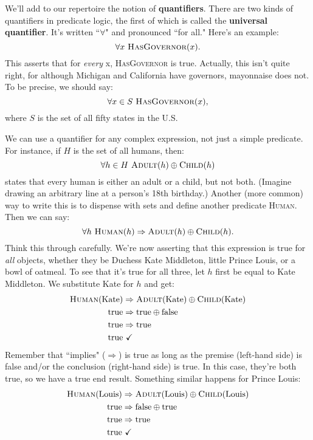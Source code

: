 We'll add to our repertoire the notion of \textbf{quantifiers}. There are
two kinds of quantifiers in predicate logic, the first of which is called
the \textbf{universal quantifier}. It's written ``$\forall$" and pronounced
``for all." Here's an example:
\[
\forall x\ \textsc{HasGovernor}(x).
\]
This asserts that for \textit{every} x, \textsc{HasGovernor} is true.
Actually, this isn't quite right, for although Michigan and California have
governors, mayonnaise does not. To be precise, we should say:
\[
\forall x\in S\ \textsc{HasGovernor}(x),
\]
where $S$ is the set of all fifty states in the U.S.

We can use a quantifier for any complex expression, not just a simple
predicate. For instance, if $H$ is the set of all humans, then:
\[
\forall h\in H\ \textsc{Adult}(h) \oplus \textsc{Child}(h)
\]
states that every human is either an adult or a child, but not both. (Imagine
drawing an arbitrary line at a person's 18th birthday.) Another
(more common) way to write this is to dispense with sets and define another
predicate \textsc{Human}. Then we can say:
\[
\forall h\ \textsc{Human}(h) \Rightarrow \textsc{Adult}(h) \oplus
\textsc{Child}(h).
\]
Think this through carefully. We're now asserting that this expression is
true for \textit{all} objects, whether they be Duchess Kate Middleton, little
Prince Louis, or a
bowl of oatmeal. To see that it's true for all three, let $h$ first be
equal to Kate Middleton. We substitute Kate for $h$ and get:
\begin{align*}
\textsc{Human}(\text{Kate}) & \Rightarrow \textsc{Adult}(\text{Kate}) \oplus \textsc{Child}(\text{Kate}) \\
\text{true} & \Rightarrow \text{true} \oplus \text{false} \\
\text{true} & \Rightarrow \text{true} \\
\text{true} & \ \checkmark
\end{align*}
Remember that ``implies" ($\Rightarrow$) is true as long as the premise
(left-hand side) is false and/or the conclusion (right-hand side) is true.
In this case, they're both true, so we have a true end result. Something
similar happens for Prince Louis:
\begin{align*}
\textsc{Human}(\text{Louis}) & \Rightarrow \textsc{Adult}(\text{Louis}) \oplus \textsc{Child}(\text{Louis}) \\
\text{true} & \Rightarrow \text{false} \oplus \text{true} \\
\text{true} & \Rightarrow \text{true} \\
\text{true} & \ \checkmark
\end{align*}

